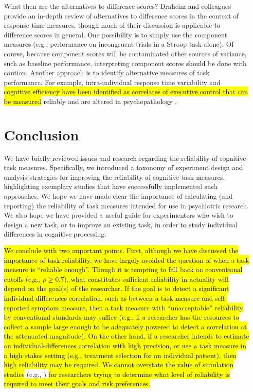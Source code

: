 \documentclass[a4paper,12pt]{article}
\begin{document}
What then are the alternatives to difference scores? Draheim and colleagues \cite{draheim2019reaction} provide an in-depth review of alternatives to difference scores in the context of response-time measures, though much of their discussion is applicable to difference scores in general. One possibility is to simply use the component measures (e.g., performance on incongruent trials in a Stroop task alone). Of course, because component scores will be contaminated other sources of variance, such as baseline performance, interpreting component scores should be done with caution. Another approach is to identify alternative measures of task performance. For example, intra-individual response time variability and \hl{cognitive efficiency have been identified as correlates of executive control that can be measured} reliably \cite{saville2011stability, weigard2021cognitive} and are altered in psychopathology \cite{kofler2013reaction, heathcote2015decision}. 

\section{Conclusion}

We have briefly reviewed issues and research regarding the reliability of cognitive-task measures. Specifically, we introduced a taxonomy of experiment design and analysis strategies for improving the reliability of cognitive-task measures, highlighting exemplary studies that have successfully implemented such approaches. We hope we have made clear the importance of calculating (and reporting) the reliability of task measures intended for use in psychiatric research. We also hope we have provided a useful guide for experimenters who wish to design a new task, or to improve an existing task, in order to study individual differences in cognitive processing. 

\hl{We conclude with two important points. First, although we have discussed the importance of task reliability, we have largely avoided the question of when a task measure is ``reliable enough''. Though it is tempting to fall back on conventional cutoffs (e.g., $\rho \geq 0.7$), what constitutes sufficient reliability in actuality will depend on the goal(s) of the researcher. If the goal is to detect a significant individual-differences correlation, such as between a task measure and self-reported symptom measure, then a task measure with ``unacceptable'' reliability by conventional standards may suffice (e.g., if a researcher has the resources to collect a sample large enough to be adequately powered to detect a correlation at the attenuated magnitude). On the other hand, if a researcher intends to estimate an individual-differences correlation with high precision, or use a task measure in a high stakes setting (e.g., treatment selection for an individual patient), then high reliability may be required. We cannot overstate the value of simulation studies} (e.g., \cite{rouder2019most}) \hl{for researchers trying to determine what level of reliability is required to meet their goals and risk preferences.}
\end{document}
